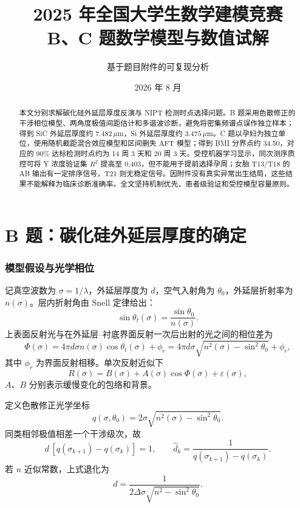 \documentclass[UTF8,zihao=-4]{ctexart}
\title{\bfseries 2025 年全国大学生数学建模竞赛\\[0.5em]
B、C 题数学模型与数值试解}
\author{基于题目附件的可复现分析}
\date{2026 年 8 月}
\begin{document}
\maketitle
\begin{abstract}
本文分别求解碳化硅外延层厚度反演与 NIPT 检测时点选择问题。B 题采用色散修正的干涉相位模型、两角度极值间距估计和多谐波诊断，避免将密集频谱点误作独立样本；得到 SiC 外延层厚度约 $7.482\,\mu\mathrm m$，Si 外延层厚度约 $3.475\,\mu\mathrm m$。C 题以孕妇为独立单位，使用随机截距混合效应模型和区间删失 AFT 模型；得到 BMI 分界点约 34.50，对应的 90\% 达标检测时点约为 14 周 3 天和 20 周 3 天。受控机器学习显示，同次测序质控可将 Y 浓度验证集 $R^2$ 提高至 0.403，但不能用于提前选择孕周；女胎 T13/T18 的 AB 输出有一定排序信号，T21 则无稳定信号。因附件没有真实异常出生结局，这些结果不能解释为临床诊断准确率。全文坚持机制优先、患者级验证和受控模型容量原则。
\end{abstract}

\tableofcontents
\clearpage

\part{B 题：碳化硅外延层厚度的确定}

\section{模型假设与光学相位}

记真空波数为 $\sigma=1/\lambda$，外延层厚度为 $d$，空气入射角为 $\theta_0$，外延层折射率为 $n(\sigma)$。层内折射角由 Snell 定律给出：
\begin{equation}
\sin\theta_t(\sigma)=\frac{\sin\theta_0}{n(\sigma)}.
\end{equation}
上表面反射光与在外延层--衬底界面反射一次后出射的光之间的相位差为
\begin{equation}
\Phi(\sigma)=4\pi d\sigma n(\sigma)\cos\theta_t(\sigma)+\phi_r
=4\pi d\sigma\sqrt{n^2(\sigma)-\sin^2\theta_0}+\phi_r,
\end{equation}
其中 $\phi_r$ 为界面反射相移。单次反射近似下
\begin{equation}
R(\sigma)=B(\sigma)+A(\sigma)\cos\Phi(\sigma)+\varepsilon(\sigma),
\end{equation}
$A$、$B$ 分别表示缓慢变化的包络和背景。

定义色散修正光学坐标
\begin{equation}
q(\sigma,\theta_0)=2\sigma\sqrt{n^2(\sigma)-\sin^2\theta_0}.
\end{equation}
同类相邻极值相差一个干涉级次，故
\begin{equation}
d\,[q(\sigma_{k+1})-q(\sigma_k)]=1,\qquad
\widehat d_k=\frac{1}{q(\sigma_{k+1})-q(\sigma_k)}.
\end{equation}
若 $n$ 近似常数，上式退化为
\begin{equation}
d=\frac{1}{2\Delta\sigma\sqrt{n^2-\sin^2\theta_0}}.
\end{equation}
\end{document}
